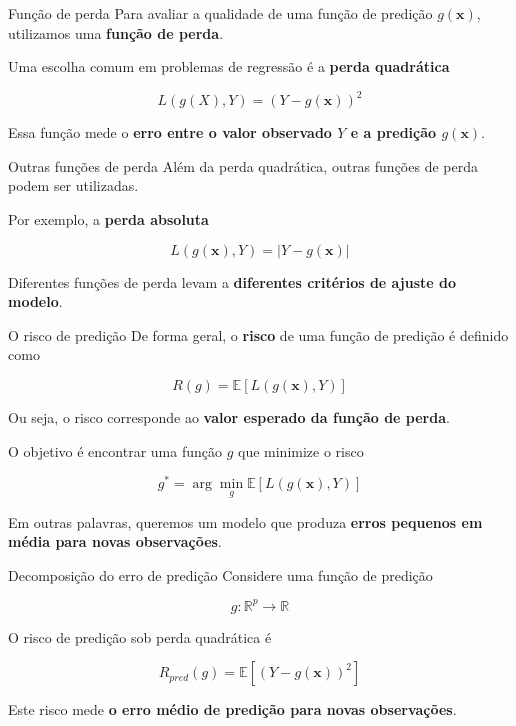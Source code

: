 \documentclass[
  ignorenonframetext,
  aspectratio=169,
]{beamer}
\begin{document}
\begin{frame}{Função de perda}
\label{funuxe7uxe3o-de-perda}
Para avaliar a qualidade de uma função de predição \(g(\mathbf{x})\),
utilizamos uma \textbf{função de perda}.

Uma escolha comum em problemas de regressão é a \textbf{perda
quadrática}

\[
L(g(X),Y) = (Y - g(\mathbf{x}))^2
\]

Essa função mede o \textbf{erro entre o valor observado \(Y\) e a
predição \(g(\mathbf{x})\)}.
\end{frame}

\begin{frame}
\begin{block}{Outras funções de perda}
\label{outras-funuxe7uxf5es-de-perda}
Além da perda quadrática, outras funções de perda podem ser utilizadas.

Por exemplo, a \textbf{perda absoluta}

\[
L(g(\mathbf{x}),Y) = |Y - g(\mathbf{x})|
\]

Diferentes funções de perda levam a \textbf{diferentes critérios de
ajuste do modelo}.
\end{block}
\end{frame}

\begin{frame}
\begin{block}{O risco de predição}
\label{o-risco-de-prediuxe7uxe3o}
De forma geral, o \textbf{risco} de uma função de predição é definido
como

\[
R(g) = \mathbb{E}[L(g(\mathbf{x}),Y)]
\]

Ou seja, o risco corresponde ao \textbf{valor esperado da função de
perda}.

O objetivo é encontrar uma função \(g\) que minimize o risco

\[
g^* = \arg\min_g \mathbb{E}[L(g(\mathbf{x}),Y)]
\]

Em outras palavras, queremos um modelo que produza \textbf{erros
pequenos em média para novas observações}.
\end{block}
\end{frame}

\begin{frame}{Decomposição do erro de predição}
\label{decomposiuxe7uxe3o-do-erro-de-prediuxe7uxe3o}
Considere uma função de predição

\[
g : \mathbb{R}^p \rightarrow \mathbb{R}
\]

O risco de predição sob perda quadrática é

\[
R_{pred}(g) = \mathbb{E}[(Y - g(\mathbf{x}))^2]
\]

Este risco mede \textbf{o erro médio de predição para novas
observações}.
\end{frame}
\end{document}

